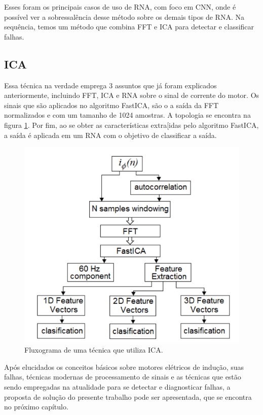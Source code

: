 Esses foram os principais casos de uso de RNA, com foco em CNN, onde é possível ver a sobressalência desse método sobre os demais
tipos de RNA. Na sequência, temos um método que combina FFT e ICA para detectar e classificar falhas.

% 

\subsection{ICA}

Essa técnica na verdade emprega 3 assuntos que já foram explicados anteriormente, incluindo FFT, ICA e RNA sobre o sinal de corrente
do motor. Os sinais que são aplicados no algoritmo FastICA, são o a saída da FFT normalizados e com um tamanho de 1024 amostras. 
A topologia se encontra na figura \ref{fig:ica_bracamonte_p4}. Por fim, ao se obter as características extra[idas pelo algoritmo FastICA,
a saída é aplicada em um RNA com o objetivo de classificar a saída.

\begin{figure}[H]
    \caption{Fluxograma de uma técnica que utiliza ICA.}
    \begin{center}
        \includegraphics[scale=.5]{referencial/img/ica_bracamonte_p4.png}
    \end{center}
    \label{fig:ica_bracamonte_p4}
\end{figure}


Após elucidados os conceitos básicos sobre motores elétricos de indução, suas falhas, técnicas modernas de processamento de sinais e as 
técnicas que estão sendo empregadas na atualidade para se detectar e diagnosticar falhas, a proposta de solução do presente trabalho 
pode ser apresentada, que se encontra no próximo capítulo.
